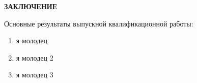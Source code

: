 \newpage
\begin{center}
  \textbf{\large ЗАКЛЮЧЕНИЕ}
\end{center}


Основные результаты выпускной квалификационной работы:
\begin{enumerate}

\item я молодец

\item я молодец 2

\item я молодец 3

\end{enumerate}
